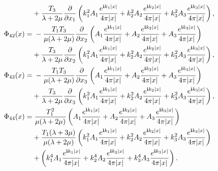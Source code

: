 \documentclass[11pt]{article}
\newcommand{\pa}{\partial}
\newcommand{\la}{\lambda}
\begin{document}
\begin{appendices}
\begin{equation*}
\begin{aligned}
&+\frac{T_3}{\la+2\mu} \frac{\pa }{\pa x_1}\left(k_1^2A_1\frac{e^{{\bf i}k_1\lvert x \rvert}}{4\pi
\lvert x \rvert}+k_2^2A_2\frac{e^{{\bf i}k_2\lvert x \rvert}}{4\pi\lvert x \rvert}+k_3^2A_3
\frac{e^{{\bf i}k_3\lvert x \rvert}}{4\pi\lvert x \rvert}\right),\\
\Phi_{42}(x)
=&\;-\frac{T_1T_3}{\mu(\la+2\mu)}  \frac{\pa }{\pa x_2}\left(A_1\frac{e^{{\bf i}k_1\lvert x \rvert}}
{4\pi\lvert x \rvert}+A_2\frac{e^{{\bf i}k_2\lvert x \rvert}}{4\pi\lvert x \rvert}+A_3\frac{e^{{\bf i}
k_3\lvert x \rvert}}{4\pi\lvert x \rvert}\right)\\
&+\frac{T_3}{\la+2\mu}\frac{\pa }{\pa x_2}\left(k_1^2A_1\frac{e^{{\bf i}k_1\lvert x \rvert}}
{4\pi\lvert x \rvert}+k_2^2A_2\frac{e^{{\bf i}k_2\lvert x \rvert}}{4\pi\lvert x \rvert}+k_3^2A_3
\frac{e^{{\bf i}k_3\lvert x \rvert}}{4\pi\lvert x \rvert}\right),\\
\Phi_{43}(x)
=&\;-\frac{T_1T_3}{\mu(\la+2\mu)}\frac{\pa }{\pa x_3}\left(A_1\frac{e^{{\bf i}k_1\lvert x \rvert}}
{4\pi\lvert x \rvert}+A_2\frac{e^{{\bf i}k_2\lvert x \rvert}}{4\pi\lvert x \rvert}+A_3\frac{e^{{\bf i}
k_3\lvert x \rvert}}{4\pi\lvert x \rvert}\right)\\
&+\frac{T_3}{\la+2\mu}\frac{\pa }{\pa x_3}\left(k_1^2A_1\frac{e^{{\bf i}k_1\lvert x \rvert}}
{4\pi\lvert x \rvert}+k_2^2A_2\frac{e^{{\bf i}k_2\lvert x \rvert}}{4\pi\lvert x \rvert}+k_3^2A_3
\frac{e^{{\bf i}k_3\lvert x \rvert}}{4\pi\lvert x \rvert}\right),\\
\Phi_{44}(x)
=&\;\frac{T_1^2}{\mu(\la+2\mu)}\left(A_1\frac{e^{{\bf i}k_1\lvert x \rvert}}{4\pi\lvert x \rvert}
+A_2\frac{e^{{\bf i}k_2\lvert x \rvert}}{4\pi\lvert x \rvert}+A_3\frac{e^{{\bf i}k_3\lvert x \rvert}}
{4\pi\lvert x \rvert}\right)\\
&+\frac{T_1(\la+3\mu)}{\mu(\la+2\mu)}\left(k_1^2A_1\frac{e^{{\bf i}k_1\lvert x \rvert}}{4\pi
\lvert x \rvert}+k_2^2A_2\frac{e^{{\bf i}k_2\lvert x \rvert}}{4\pi\lvert x \rvert}+k_3^2A_3
\frac{e^{{\bf i}k_3\lvert x \rvert}}{4\pi\lvert x \rvert}\right)\\
&+\left(k_1^4A_1\frac{e^{{\bf i}k_1\lvert x \rvert}}{4\pi\lvert x \rvert}+k_2^4A_2
\frac{e^{{\bf i}k_2\lvert x \rvert}}{4\pi\lvert x \rvert}+k_3^4A_3\frac{e^{{\bf i}k_3
\lvert x \rvert}}{4\pi\lvert x \rvert}\right).
\end{aligned}
\end{equation*}
\end{appendices}  
\end{document}
